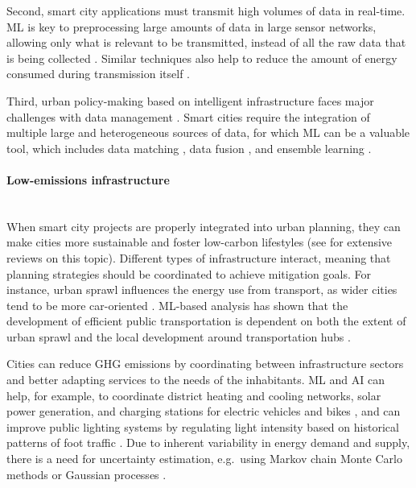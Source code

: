 \documentclass[11pt]{report}
\newcommand{\Gap}{\texorpdfstring{\hfill}{}}
\begin{document}
Second, smart city applications must transmit high volumes of data in real-time. ML is key to preprocessing large
amounts of data in large sensor networks, allowing only what is relevant to be transmitted, instead of all the raw
data that is being collected \cite{li2016geospatial, valerio2016hypothesis, ravi2017deep}. Similar techniques also help to reduce the amount of energy consumed during
transmission itself \cite{muhammad2019intelligent}.

Third, urban policy-making based on intelligent infrastructure faces major challenges with data management \cite{Giest_2017}.
Smart cities require the integration of multiple large and heterogeneous sources of data, for which ML can be a valuable tool, which includes data matching \cite{bordes2014semantic,doan2004ontology}, data fusion \cite{methodologies-for-cross-domain}, and ensemble learning \cite{krawczyk2017ensemble}.


\paragraph{Low-emissions infrastructure}\Gap\mbox{}\\\label{sec:smart_cities}When smart city projects are properly integrated into urban planning, they can make cities more sustainable and foster low-carbon lifestyles (see \cite{wu2016big,o2019smart,muhammad2019intelligent} for extensive reviews on this topic). Different types of infrastructure interact, meaning that planning strategies should be coordinated to achieve mitigation goals. For instance, urban sprawl influences the energy use from transport, as wider cities tend to be more car-oriented \cite{ewing_does_2017,creutzig_global_2015,ding2018applying}. ML-based analysis has shown that the development of efficient public transportation is dependent on both the extent of urban sprawl and the local development around transportation hubs \cite{silva2018scenario,monajem2015evaluation}. 

Cities can reduce GHG emissions by coordinating between infrastructure sectors and better adapting services to the needs of the inhabitants. ML and AI can help, for example, to coordinate district heating and cooling networks, solar power generation, and charging stations for electric vehicles and bikes \cite{o2019smart}, and can improve public lighting systems by regulating light intensity based on historical patterns of foot traffic \cite{de2016intelligent}. Due to inherent variability in energy demand and supply, there is a need for uncertainty estimation, e.g.~using Markov chain Monte Carlo methods or Gaussian processes \cite{o2019smart}.
\end{document}
